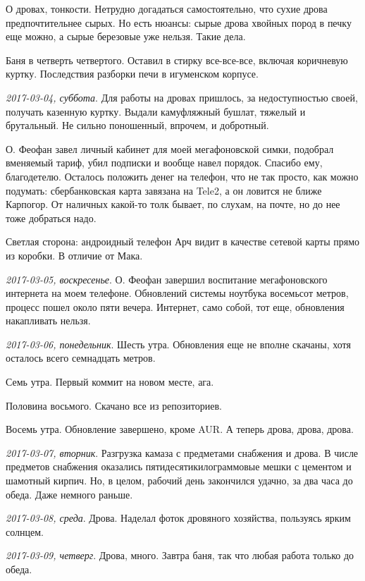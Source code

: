 \documentclass[
    12pt
    ,a4paper
    ,oneside
    ,russian
]{memoir}
\newcommand{\mydatestamp}{
    \bigskip   %
    \emph
}
\newcommand{\mds}{\mydatestamp}
\begin{document}
    О дровах, тонкости. Нетрудно догадаться самостоятельно, что сухие дрова предпочтительнее сырых. Но есть нюансы: сырые дрова хвойных пород в печку еще можно, а сырые березовые уже нельзя. Такие дела.
     
    Баня в четверть четвертого. Оставил в стирку все-все-все, включая коричневую куртку. Последствия разборки печи в игуменском корпусе.
    
    \mds{2017-03-04, суббота}. Для работы на дровах пришлось, за недоступностью своей, получать казенную куртку. Выдали камуфляжный бушлат, тяжелый и брутальный. Не сильно поношенный, впрочем, и добротный.
    
    О. Феофан завел личный кабинет для моей мегафоновской симки, подобрал вменяемый тариф, убил подписки и вообще навел порядок. Спасибо ему, благодетелю. Осталось положить денег на телефон, что не так просто, как можно подумать: сбербанковская карта завязана на Tele2, а он ловится не ближе Карпогор. От наличных какой-то толк бывает, по слухам, на почте, но до нее тоже добраться надо.
    
    Светлая сторона: андроидный телефон Арч видит в качестве сетевой карты прямо из коробки. В отличие от Мака.
    
    \mds{2017-03-05, воскресенье}. О. Феофан завершил воспитание мегафоновского интернета на моем телефоне. Обновлений системы ноутбука восемьсот метров, процесс пошел около пяти вечера. Интернет, само собой, тот еще, обновления накапливать нельзя.
    
    \mds{2017-03-06, понедельник}. Шесть утра. Обновления еще не вполне скачаны, хотя осталось всего семнадцать метров.
    
    Семь утра. Первый коммит на новом месте, ага.
    
    Половина восьмого. Скачано все из репозиториев.
    
    Восемь утра. Обновление завершено, кроме AUR. А теперь дрова, дрова, дрова.
    
    \mds{2017-03-07, вторник}. Разгрузка камаза с предметами снабжения и дрова. В числе предметов снабжения оказались пятидесятикилограммовые мешки с цементом и шамотный кирпич. Но, в целом, рабочий день закончился удачно, за два часа до обеда. Даже немного раньше.
    
    \mds{2017-03-08, среда}. Дрова. Наделал фоток дровяного хозяйства, пользуясь ярким солнцем.
    
    \mds{2017-03-09, четверг}. Дрова, много. Завтра баня, так что любая работа только до обеда.
    
\end{document}
